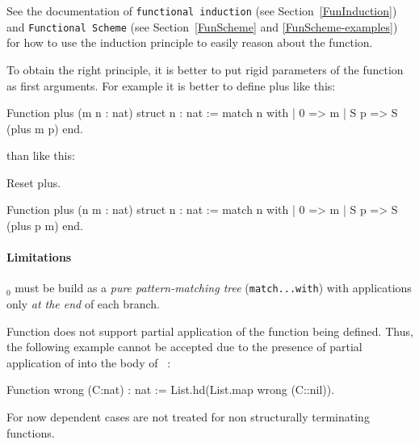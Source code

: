 See the documentation of {\tt functional induction}
(see Section~\ref{FunInduction}) and {\tt Functional Scheme}
(see Section~\ref{FunScheme} and \ref{FunScheme-examples}) for how to use the
induction principle to easily reason about the function.

 To obtain the right principle, it is better
to put rigid parameters of the function as first arguments. For
example it is better to define plus like this:

\begin{coq_example*}
Function plus (m n : nat) {struct n} : nat :=
  match n with
  | 0 => m
  | S p => S (plus m p)
  end.
\end{coq_example*}
\noindent than like this:
\begin{coq_eval}
Reset plus.
\end{coq_eval}
\begin{coq_example*}
Function plus (n m : nat) {struct n} : nat :=
  match n with
  | 0 => m
  | S p => S (plus p m)
  end.
\end{coq_example*}

\paragraph[Limitations]{Limitations\label{sec:Function-limitations}}
\term$_0$ must be build as a \emph{pure pattern-matching tree}
(\texttt{match...with}) with applications only \emph{at the end} of
each branch.  

Function does not support partial application of the function being defined. Thus, the following example cannot be accepted due to the presence of partial application of  into the body of ~:
\begin{coq_example*}
  Function wrong (C:nat) : nat := 
    List.hd(List.map wrong (C::nil)).
\end{coq_example*}

For now dependent cases are not treated for non structurally terminating functions.



